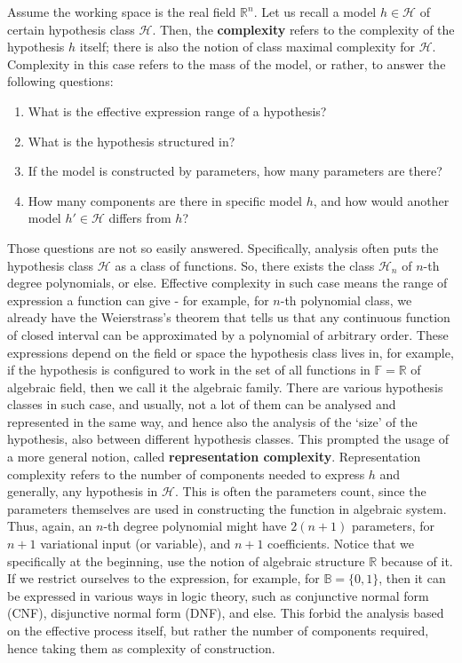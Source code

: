 Assume the working space is the real field $\mathbb{R}^{n}$. Let us recall a model $h\in\mathcal{H}$ of certain hypothesis class $\mathcal{H}$. Then, the \textbf{complexity} refers to the complexity of the hypothesis $h$ itself; there is also the notion of class maximal complexity for $\mathcal{H}$. Complexity in this case refers to the mass of the model, or rather, to answer the following questions:
\begin{enumerate}[itemsep=0.5pt,topsep=0.5pt]
    \item What is the effective expression range of a hypothesis?
    \item What is the hypothesis structured in?
    \item If the model is constructed by parameters, how many parameters are there?
    \item How many components are there in specific model $h$, and how would another model $h'\in \mathcal{H}$ differs from $h$?
\end{enumerate}
Those questions are not so easily answered. Specifically, analysis often puts the hypothesis class $\mathcal{H}$ as a class of functions. So, there exists the class $\mathcal{H}_{n}$ of $n$-th degree polynomials, or else. Effective complexity in such case means the range of expression a function can give - for example, for $n$-th polynomial class, we already have the Weierstrass's theorem that tells us that any continuous function of closed interval can be approximated by a polynomial of arbitrary order. These expressions depend on the field or space the hypothesis class lives in, for example, if the hypothesis is configured to work in the set of all functions in $\mathbb{F}=\mathbb{R}$ of algebraic field, then we call it the algebraic family. There are various hypothesis classes in such case, and usually, not a lot of them can be analysed and represented in the same way, and hence also the analysis of the `size' of the hypothesis, also between different hypothesis classes. This prompted the usage of a more general notion, called \textbf{representation complexity}. Representation complexity refers to the number of components needed to express $h$ and generally, any hypothesis in $\mathcal{H}$. This is often the parameters count, since the parameters themselves are used in constructing the function in algebraic system. Thus, again, an $n$-th degree polynomial might have $2(n+1)$ parameters, for $n+1$ variational input (or variable), and $n+1$ coefficients. Notice that we specifically at the beginning, use the notion of algebraic structure $\mathbb{R}$ because of it. If we restrict ourselves to the expression, for example, for $\mathbb{B}=\{0,1\}$, then it can be expressed in various ways in logic theory, such as conjunctive normal form (CNF), disjunctive normal form (DNF), and else. This forbid the analysis based on the effective process itself, but rather the number of components required, hence taking them as complexity of construction. 

